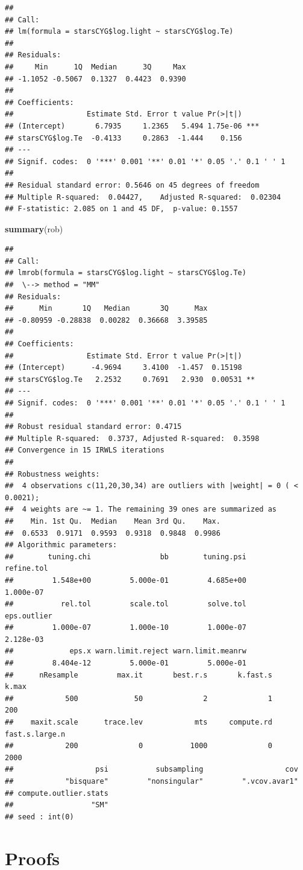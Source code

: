 \documentclass[]{book}
\newenvironment{Shaded}{\begin{snugshade}}{\end{snugshade}}
\newcommand{\KeywordTok}[1]{\textcolor[rgb]{0.13,0.29,0.53}{\textbf{#1}}}
\newcommand{\NormalTok}[1]{#1}
\theoremstyle{definition}
\theoremstyle{definition}
\theoremstyle{definition}
\theoremstyle{remark}
\begin{document}
\begin{verbatim}
## 
## Call:
## lm(formula = starsCYG$log.light ~ starsCYG$log.Te)
## 
## Residuals:
##     Min      1Q  Median      3Q     Max 
## -1.1052 -0.5067  0.1327  0.4423  0.9390 
## 
## Coefficients:
##                 Estimate Std. Error t value Pr(>|t|)    
## (Intercept)       6.7935     1.2365   5.494 1.75e-06 ***
## starsCYG$log.Te  -0.4133     0.2863  -1.444    0.156    
## ---
## Signif. codes:  0 '***' 0.001 '**' 0.01 '*' 0.05 '.' 0.1 ' ' 1
## 
## Residual standard error: 0.5646 on 45 degrees of freedom
## Multiple R-squared:  0.04427,    Adjusted R-squared:  0.02304 
## F-statistic: 2.085 on 1 and 45 DF,  p-value: 0.1557
\end{verbatim}

\begin{Shaded}
\begin{Highlighting}[]
\KeywordTok{summary}\NormalTok{(rob)}
\end{Highlighting}
\end{Shaded}

\begin{verbatim}
## 
## Call:
## lmrob(formula = starsCYG$log.light ~ starsCYG$log.Te)
##  \--> method = "MM"
## Residuals:
##      Min       1Q   Median       3Q      Max 
## -0.80959 -0.28838  0.00282  0.36668  3.39585 
## 
## Coefficients:
##                 Estimate Std. Error t value Pr(>|t|)   
## (Intercept)      -4.9694     3.4100  -1.457  0.15198   
## starsCYG$log.Te   2.2532     0.7691   2.930  0.00531 **
## ---
## Signif. codes:  0 '***' 0.001 '**' 0.01 '*' 0.05 '.' 0.1 ' ' 1
## 
## Robust residual standard error: 0.4715 
## Multiple R-squared:  0.3737, Adjusted R-squared:  0.3598 
## Convergence in 15 IRWLS iterations
## 
## Robustness weights: 
##  4 observations c(11,20,30,34) are outliers with |weight| = 0 ( < 0.0021); 
##  4 weights are ~= 1. The remaining 39 ones are summarized as
##    Min. 1st Qu.  Median    Mean 3rd Qu.    Max. 
##  0.6533  0.9171  0.9593  0.9318  0.9848  0.9986 
## Algorithmic parameters: 
##        tuning.chi                bb        tuning.psi        refine.tol 
##         1.548e+00         5.000e-01         4.685e+00         1.000e-07 
##           rel.tol         scale.tol         solve.tol       eps.outlier 
##         1.000e-07         1.000e-10         1.000e-07         2.128e-03 
##             eps.x warn.limit.reject warn.limit.meanrw 
##         8.404e-12         5.000e-01         5.000e-01 
##      nResample         max.it       best.r.s       k.fast.s          k.max 
##            500             50              2              1            200 
##    maxit.scale      trace.lev            mts     compute.rd fast.s.large.n 
##            200              0           1000              0           2000 
##                   psi           subsampling                   cov 
##            "bisquare"         "nonsingular"         ".vcov.avar1" 
## compute.outlier.stats 
##                  "SM" 
## seed : int(0)
\end{verbatim}

\chapter{Proofs}\label{appendixc}


\end{document}
